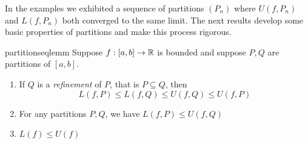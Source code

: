 In the examples we exhibited a sequence of partitions $(P_n)$ where $U(f,P_n)$ and $L(f,P_n)$ both converged to the same limit. The next results develop some basic properties of partitions and make this process rigorous.


\begin{lemm}{}{partitionseqlemm}
Suppose $f:[a,b]\to\mathbb{R}$ is bounded and suppose $P,Q$ are partitions of $[a,b]$.
\begin{enumerate}
  \item If $Q$ is a \emph{refinement} of $P$, that is $P\subseteq Q$, then
  \[L(f,P)\le L(f,Q)\le U(f,Q)\le U(f,P)\]
  \item For any partitions $P,Q$, we have $L(f,P)\le U(f,Q)$
  \item $L(f)\le U(f)$
\end{enumerate} 
\end{lemm}

\goodbreak

